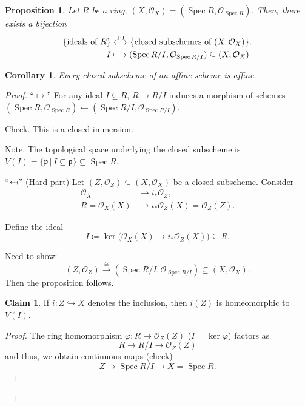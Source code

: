 \documentclass[12pt]{article}
\DeclareMathOperator{\Spec}{Spec}
\newtheorem*{proposition}{Proposition}
\newtheorem*{corollary}{Corollary}
\theoremstyle{definition}
\newtheorem{claim+}{Claim}
\begin{document}
\begin{proposition}
Let $R$ be a ring, $(X,\mathcal{O}_X)=(\Spec R,\mathcal{O}_{\Spec R})$. Then, there exists a bijection
\begin{align*}
\{\text{ideals of }R\}&\xleftrightarrow{1:1}\big\{\text{closed subschemes of }(X,\mathcal{O}_X)\big\}.\\
I&\longmapsto(\Spec R/I,\mathcal{O}_{\Spec R/I})\subseteq(X,\mathcal{O}_X)
\end{align*}
\end{proposition}

\begin{corollary}
Every closed subscheme of an affine scheme is affine.
\end{corollary}

\begin{proof}
``$\mapsto$'' For any ideal $I\subseteq R$, $R\rightarrow R/I$ induces a morphism of schemes $(\Spec R,\mathcal{O}_{\Spec R})\leftarrow(\Spec R/I,\mathcal{O}_{\Spec R/I})$.

Check. This is a closed immersion.

Note. The topological space underlying the closed subscheme is $V(I)=\{\mathfrak{p}\,|\,I\subseteq\mathfrak{p}\}\subseteq\Spec R$.

``$\leftarrow\!\shortmid$'' (Hard part) Let $(Z,\mathcal{O}_Z)\subseteq(X,\mathcal{O}_X)$ be a closed subscheme. Consider
\begin{align*}
\mathcal{O}_X&\longrightarrow i_*\mathcal{O}_Z,\\
R=\mathcal{O}_X(X)&\longrightarrow i_*\mathcal{O}_Z(X)=\mathcal{O}_Z(Z).
\end{align*}

Define the ideal
\[I\coloneqq\ker\big(\mathcal{O}_X(X)\rightarrow i_*\mathcal{O}_Z(X)\big)\subseteq R.\]

Need to show:
\[(Z,\mathcal{O}_Z)\overset{\cong}{\longrightarrow}(\Spec R/I,\mathcal{O}_{\Spec R/I})\subseteq(X,\mathcal{O}_X).\]
Then the proposition follows.

\begin{claim+}
If $i:Z\hookrightarrow X$ denotes the inclusion, then $i(Z)$ is homeomorphic to $V(I)$.
\end{claim+}

\begin{proof}
The ring homomorphism $\varphi:R\rightarrow\mathcal{O}_Z(Z)$ ($I=\ker\varphi$) factors as
\[R\longrightarrow R/I\longrightarrow\mathcal{O}_Z(Z)\]
and thus, we obtain continuous maps (check)
\[Z\longrightarrow\Spec R/I\longrightarrow X=\Spec R.\]


\end{proof}
\end{proof}
\end{document}
